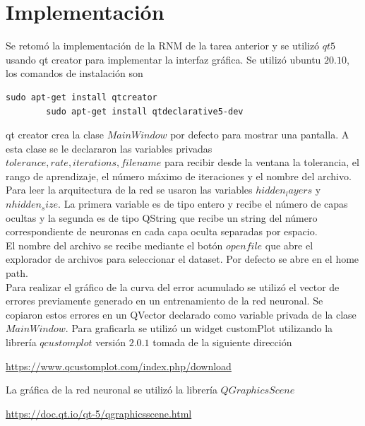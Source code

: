 \documentclass[12pt,letterpaper]{article}
\theoremstyle{definition}
\theoremstyle{definition}
\theoremstyle{definition}
\theoremstyle{definition}
\theoremstyle{definition}
\theoremstyle{definition}
\begin{document}
	\section{Implementación}
	Se retomó la implementación de la RNM de la tarea anterior y se utilizó $ qt5 $ usando qt creator para implementar la interfaz gráfica. Se utilizó ubuntu $ 20.10 $, los comandos de instalación son
	\lstset{language= C++, breaklines=true, basicstyle=\footnotesize}
	\begin{lstlisting}[frame=single]
		sudo apt-get install qtcreator
		sudo apt-get install qtdeclarative5-dev
	\end{lstlisting} 
	qt creator crea la clase $ MainWindow $ por defecto para mostrar una pantalla. A esta clase se le declararon las variables privadas
	$ tolerance, rate, iterations, filename $ para recibir desde la ventana la tolerancia, el rango de aprendizaje, el número máximo de iteraciones y el nombre del archivo. \\
	Para leer la arquitectura de la red se usaron las variables $ hidden_layers $ y $ nhidden_size $. La primera variable es de tipo entero y recibe el número de capas ocultas y la segunda es de tipo QString que recibe un string del número correspondiente de neuronas en cada capa oculta separadas por espacio.\\
	El nombre del archivo se recibe mediante el botón $ open file $ que abre el explorador de archivos para seleccionar el dataset. Por defecto se abre en el home path. \\
	Para realizar el gráfico de la curva del error acumulado se utilizó el vector de errores previamente generado en un entrenamiento de la red neuronal. Se copiaron estos errores en un QVector declarado como variable privada de la clase $ MainWindow $. Para graficarla se utilizó un widget customPlot utilizando la librería $ qcustomplot $ versión $ 2.0.1 $ tomada de la siguiente dirección
	\begin{center}
		\url{https://www.qcustomplot.com/index.php/download} 
	\end{center}
	La gráfica de la red neuronal se utilizó la librería $ QGraphicsScene $ 
	\begin{center}
		\url{https://doc.qt.io/qt-5/qgraphicsscene.html}
	\end{center}
\end{document}
